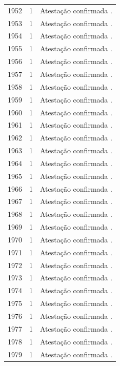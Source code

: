 \begin{longtable}{rrp{}}
1952 & 1 & Atestação confirmada \cite{anual1952}. \\
1953 & 1 & Atestação confirmada \cite{anual1953}. \\
1954 & 1 & Atestação confirmada \cite{anual1954}. \\
1955 & 1 & Atestação confirmada \cite{camara1955}. \\
1956 & 1 & Atestação confirmada \cite{anual1956}. \\
1957 & 1 & Atestação confirmada \cite{anual1957}. \\
1958 & 1 & Atestação confirmada \cite{anual1958}. \\
1959 & 1 & Atestação confirmada \cite{anual1959}. \\
1960 & 1 & Atestação confirmada \cite{anual1960}. \\
1961 & 1 & Atestação confirmada \cite{anual1961}. \\
1962 & 1 & Atestação confirmada \cite{anual1962}. \\
1963 & 1 & Atestação confirmada \cite{anual1963}. \\
1964 & 1 & Atestação confirmada \cite{anual1964}. \\
1965 & 1 & Atestação confirmada \cite{senado1965}. \\
1966 & 1 & Atestação confirmada \cite{anual1966}. \\
1967 & 1 & Atestação confirmada \cite{anual1967}. \\
1968 & 1 & Atestação confirmada \cite{anual1968}. \\
1969 & 1 & Atestação confirmada \cite{anual1969}. \\
1970 & 1 & Atestação confirmada \cite{anual1970}. \\
1971 & 1 & Atestação confirmada \cite{anual1971}. \\
1972 & 1 & Atestação confirmada \cite{anual1972}. \\
1973 & 1 & Atestação confirmada \cite{anual1973}. \\
1974 & 1 & Atestação confirmada \cite{anual1974}. \\
1975 & 1 & Atestação confirmada \cite{anual1975}. \\
1976 & 1 & Atestação confirmada \cite{anual1976}. \\
1977 & 1 & Atestação confirmada \cite{anual1977}. \\
1978 & 1 & Atestação confirmada \cite{anual1978}. \\
1979 & 1 & Atestação confirmada \cite{correio1979}. \\

\end{longtable}
